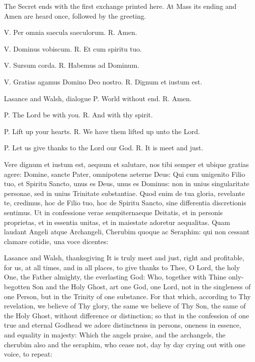 The Secret ends with the first exchange printed here. At Mass its ending and Amen are heard once, followed by the greeting.

\begin{latinproper}
V. Per omnia saecula saeculorum. R. Amen.

V. Dominus vobiscum. R. Et cum spiritu tuo.

V. Sursum corda. R. Habemus ad Dominum.

V. Gratias agamus Domino Deo nostro. R. Dignum et iustum est.
\end{latinproper}

\begin{englishwitness}{Lasance and Walsh, dialogue}
P. World without end. R. Amen.

P. The Lord be with you. R. And with thy spirit.

P. Lift up your hearts. R. We have them lifted up unto the Lord.

P. Let us give thanks to the Lord our God. R. It is meet and just.
\end{englishwitness}

\begin{latinproper}
Vere dignum et iustum est, aequum et salutare, nos tibi semper et ubique
gratias agere: Domine, sancte Pater, omnipotens aeterne Deus: Qui cum
unigenito Filio tuo, et Spiritu Sancto, unus es Deus, unus es Dominus:
non in unius singularitate personae, sed in unius Trinitate substantiae.
Quod enim de tua gloria, revelante te, credimus, hoc de Filio tuo, hoc
de Spiritu Sancto, sine differentia discretionis sentimus. Ut in
confessione verae sempiternaeque Deitatis, et in personis proprietas,
et in essentia unitas, et in maiestate adoretur aequalitas. Quam laudant
Angeli atque Archangeli, Cherubim quoque ac Seraphim: qui non cessant
clamare cotidie, una voce dicentes:
\end{latinproper}

\begin{englishwitness}{Lasance and Walsh, thanksgiving}
It is truly meet and just, right and profitable, for us, at all times, and
in all places, to give thanks to Thee, O Lord, the holy One, the Father
almighty, the everlasting God: Who, together with Thine only-begotten Son
and the Holy Ghost, art one God, one Lord, not in the singleness of one
Person, but in the Trinity of one substance. For that which, according to
Thy revelation, we believe of Thy glory, the same we believe of Thy Son,
the same of the Holy Ghost, without difference or distinction; so that
in the confession of one true and eternal Godhead we adore distinctness
in persons, oneness in essence, and equality in majesty: Which the angels
praise, and the archangels, the cherubim also and the seraphim, who cease
not, day by day crying out with one voice, to repeat:
\end{englishwitness}

